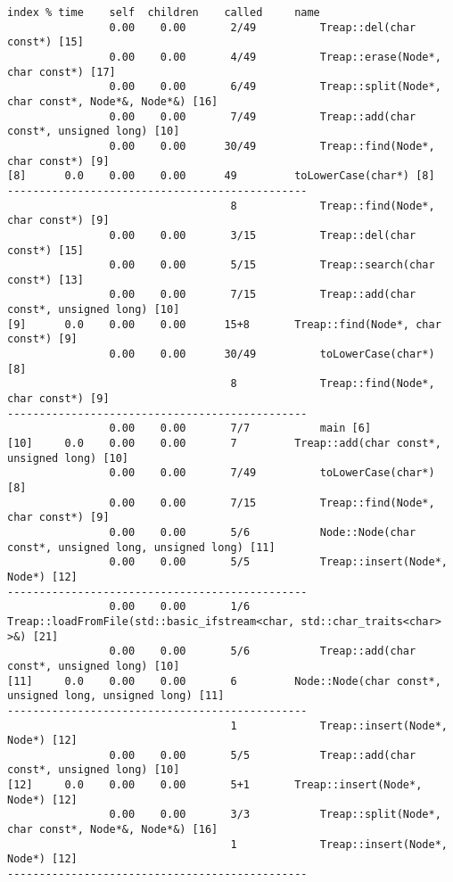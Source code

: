 \documentclass[12pt]{article}
\begin{document}
\begin{lstlisting}[breaklines]
index % time    self  children    called     name
                0.00    0.00       2/49          Treap::del(char const*) [15]
                0.00    0.00       4/49          Treap::erase(Node*, char const*) [17]
                0.00    0.00       6/49          Treap::split(Node*, char const*, Node*&, Node*&) [16]
                0.00    0.00       7/49          Treap::add(char const*, unsigned long) [10]
                0.00    0.00      30/49          Treap::find(Node*, char const*) [9]
[8]      0.0    0.00    0.00      49         toLowerCase(char*) [8]
-----------------------------------------------
                                   8             Treap::find(Node*, char const*) [9]
                0.00    0.00       3/15          Treap::del(char const*) [15]
                0.00    0.00       5/15          Treap::search(char const*) [13]
                0.00    0.00       7/15          Treap::add(char const*, unsigned long) [10]
[9]      0.0    0.00    0.00      15+8       Treap::find(Node*, char const*) [9]
                0.00    0.00      30/49          toLowerCase(char*) [8]
                                   8             Treap::find(Node*, char const*) [9]
-----------------------------------------------
                0.00    0.00       7/7           main [6]
[10]     0.0    0.00    0.00       7         Treap::add(char const*, unsigned long) [10]
                0.00    0.00       7/49          toLowerCase(char*) [8]
                0.00    0.00       7/15          Treap::find(Node*, char const*) [9]
                0.00    0.00       5/6           Node::Node(char const*, unsigned long, unsigned long) [11]
                0.00    0.00       5/5           Treap::insert(Node*, Node*) [12]
-----------------------------------------------
                0.00    0.00       1/6           Treap::loadFromFile(std::basic_ifstream<char, std::char_traits<char> >&) [21]
                0.00    0.00       5/6           Treap::add(char const*, unsigned long) [10]
[11]     0.0    0.00    0.00       6         Node::Node(char const*, unsigned long, unsigned long) [11]
-----------------------------------------------
                                   1             Treap::insert(Node*, Node*) [12]
                0.00    0.00       5/5           Treap::add(char const*, unsigned long) [10]
[12]     0.0    0.00    0.00       5+1       Treap::insert(Node*, Node*) [12]
                0.00    0.00       3/3           Treap::split(Node*, char const*, Node*&, Node*&) [16]
                                   1             Treap::insert(Node*, Node*) [12]
-----------------------------------------------

\end{lstlisting}
\end{document}

